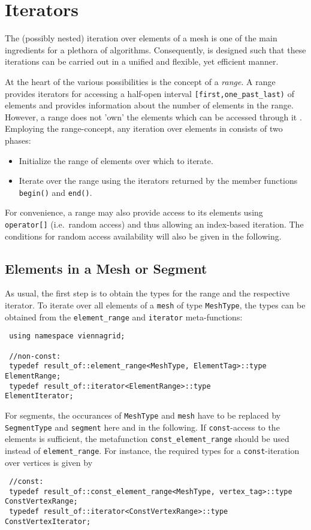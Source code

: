 \chapter{Iterators} \label{chap:iterators}

The (possibly nested) iteration over elements of a mesh is one of the main ingredients for a plethora of algorithms.
Consequently, {\ViennaGrid} is designed such that these iterations can be carried out in a unified and flexible, yet efficient manner.

At the heart of the various possibilities is the concept of a \emph{range}. A range provides iterators for accessing a half-open interval \texttt{[first,one\_past\_last)} of elements and provides information about the number of elements in the range. However, a range does not 'own' the elements which can be accessed through it \cite{boost}. 
Employing the range-concept, any iteration over elements in {\ViennaGrid} consists of two phases:
\begin{itemize}
 \item Initialize the range of elements over which to iterate.
 \item Iterate over the range using the iterators returned by the member functions \lstinline|begin()| and \lstinline|end()|.
\end{itemize}

For convenience, a range may also provide access to its elements using \lstinline|operator[]| (i.e.~random access) and thus allowing an index-based iteration. The conditions for random access availability will also be given in the following.


\section{Elements in a Mesh or Segment}
As usual, the first step is to obtain the types for the range and the respective iterator.
To iterate over all elements of a \lstinline|mesh| of type \lstinline|MeshType|, the types can be obtained from the \lstinline|element_range| and \lstinline|iterator| meta-functions:
\begin{lstlisting}
 using namespace viennagrid;

 //non-const:
 typedef result_of::element_range<MeshType, ElementTag>::type ElementRange;
 typedef result_of::iterator<ElementRange>::type                ElementIterator;
\end{lstlisting}
For segments, the occurances of \lstinline|MeshType| and \lstinline|mesh| have to be replaced by \lstinline|SegmentType| and \lstinline|segment| here and in the following.
If \lstinline|const|-access to the elements is sufficient, the metafunction \lstinline|const_element_range| should be used instead of \lstinline|element_range|.
For instance, the required types for a \lstinline|const|-iteration over vertices is given by
\begin{lstlisting}
 //const:
 typedef result_of::const_element_range<MeshType, vertex_tag>::type   ConstVertexRange;
 typedef result_of::iterator<ConstVertexRange>::type         ConstVertexIterator;
\end{lstlisting}

